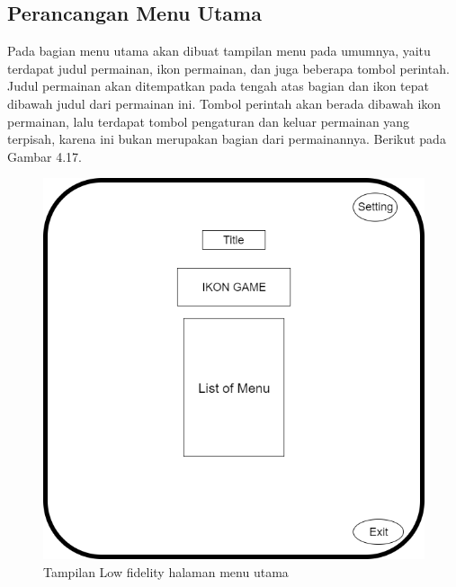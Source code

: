	\subsection{Perancangan Menu Utama}
	Pada bagian menu utama akan dibuat tampilan menu pada umumnya, yaitu terdapat judul permainan, ikon permainan, dan juga beberapa tombol perintah. Judul permainan akan ditempatkan pada tengah atas bagian dan ikon tepat dibawah judul dari permainan ini. Tombol perintah akan berada dibawah ikon permainan, lalu terdapat tombol pengaturan dan keluar permainan yang terpisah, karena ini bukan merupakan bagian dari permainannya. Berikut pada Gambar 4.17.
	\begin{figure}
		\centering
		\includegraphics[width=\linewidth-80pt]{pics/low/low1}
		\caption{Tampilan Low fidelity halaman menu utama}
	\end{figure}
	

